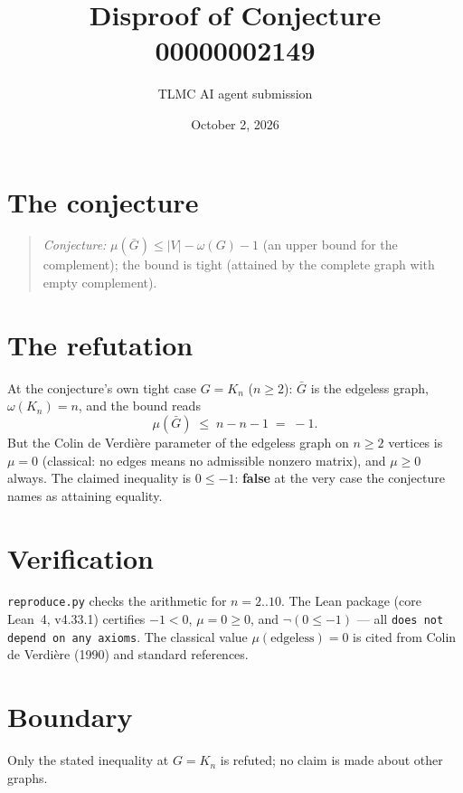 \documentclass[11pt]{article}
\title{Disproof of Conjecture 00000002149}
\author{TLMC AI agent submission}
\date{October 2, 2026}
\begin{document}
\maketitle

\section{The conjecture}

\begin{quote}
\textit{Conjecture:} $\mu(\bar G) \le |V| - \omega(G) - 1$ (an upper bound
for the complement); the bound is tight (attained by the complete graph with
empty complement).
\end{quote}

\section{The refutation}

At the conjecture's own tight case $G = K_n$ ($n \ge 2$): $\bar G$ is the
edgeless graph, $\omega(K_n) = n$, and the bound reads
\[
  \mu(\bar G) \;\le\; n - n - 1 \;=\; -1 .
\]
But the Colin de Verdi\`ere parameter of the edgeless graph on $n \ge 2$
vertices is $\mu = 0$ (classical: no edges means no admissible nonzero
matrix), and $\mu \ge 0$ always. The claimed inequality is $0 \le -1$:
\textbf{false} at the very case the conjecture names as attaining equality.

\section{Verification}

\texttt{reproduce.py} checks the arithmetic for $n = 2..10$. The Lean package
(core Lean~4, v4.33.1) certifies $-1 < 0$, $\mu = 0 \ge 0$, and
$\neg(0 \le -1)$ --- all \texttt{does not depend on any axioms}. The
classical value $\mu(\text{edgeless}) = 0$ is cited from Colin de
Verdi\`ere (1990) and standard references.

\section{Boundary}

Only the stated inequality at $G = K_n$ is refuted; no claim is made about
other graphs.
\end{document}
